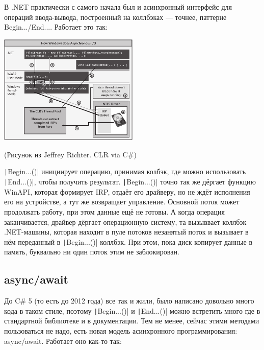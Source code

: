 \documentclass[a5paper]{article}
\begin{document}
В .NET практически с самого начала был и асинхронный интерфейс для операций ввода-вывода, построенный на коллбэках --- точнее, паттерне Begin.../End.... Работает это так:

\begin{center}
    \includegraphics[width=0.5\textwidth]{windowsAsynchronousIO.png}

    \begin{footnotesize}(Рисунок из Jeffrey Richter. CLR via C\#)\end{footnotesize}
\end{center}

\texttt|Begin...()| инициирует операцию, принимая колбэк, где можно использовать \texttt|End...()|, чтобы получить результат. \texttt|Begin...()| точно так же дёргает функцию WinAPI, которая формирует IRP, отдаёт его драйверу, но не ждёт исполнения его на устройстве, а тут же возвращает управление. Основной поток может продолжать работу, при этом данные ещё не готовы. А когда операция заканчивается, драйвер дёргает операционную систему, та вызыввает коллбэк .NET-машины, которая находит в пуле потоков незанятый поток и вызывает в нём переданный в \texttt|Begin...()| коллбэк. При этом, пока диск копирует данные в память, буквально ни один поток этим не заблокирован.

\subsection{async/await}

До C\# 5 (то есть до 2012 года) все так и жили, было написано довольно много кода в таком стиле, поэтому \texttt|Begin...()| и \texttt|End...()| можно встретить много где в стандартной библиотеке и в документации. Тем не менее, сейчас этими методами пользоваться не надо, есть новая модель асинхронного программирования: async/await. Работает оно как-то так:
\end{document}
